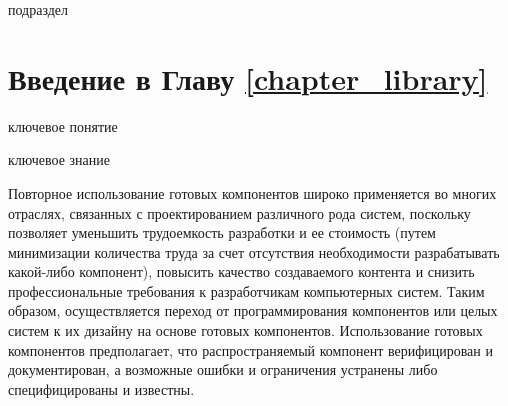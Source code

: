 \bigskip

\begin{SCn}
\begin{scnrelfromlist}{подраздел}
\end{scnrelfromlist}
\end{SCn}

\section*{Введение в Главу \ref{chapter_library}}
\label{ostis_library_introduction}

\begin{SCn}
\begin{scnrelfromlist}{ключевое понятие}
\end{scnrelfromlist}
\end{SCn}

\bigskip

\begin{SCn}
\begin{scnrelfromlist}{ключевое знание}
\end{scnrelfromlist}
\end{SCn}

\bigskip

Повторное использование готовых компонентов широко применяется во многих отраслях, связанных с проектированием различного рода систем, поскольку позволяет уменьшить трудоемкость разработки и ее стоимость (путем минимизации количества труда за счет отсутствия необходимости разрабатывать какой-либо компонент), повысить качество создаваемого контента и снизить профессиональные требования к разработчикам компьютерных систем. Таким образом, осуществляется переход от программирования компонентов или целых систем к их дизайну на основе готовых компонентов. Использование готовых компонентов предполагает, что распространяемый компонент верифицирован и документирован, а возможные ошибки и ограничения устранены либо специфицированы и известны.

